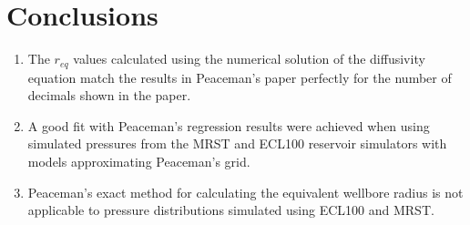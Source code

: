 \section{Conclusions} %
\label{sec:conclusions}
\begin{enumerate}
    \item The $r_{eq}$ values calculated using the numerical solution of the diffusivity equation match the results in Peaceman's paper \cite{Peaceman1978Interpretation} perfectly for the number of decimals shown in the paper.
    \item A good fit with Peaceman's regression results were achieved when using simulated pressures from the MRST and ECL100 reservoir simulators with models approximating Peaceman's grid.
    \item Peaceman's exact method for calculating the equivalent wellbore radius is not applicable to pressure distributions simulated using ECL100 and MRST.
\end{enumerate}
